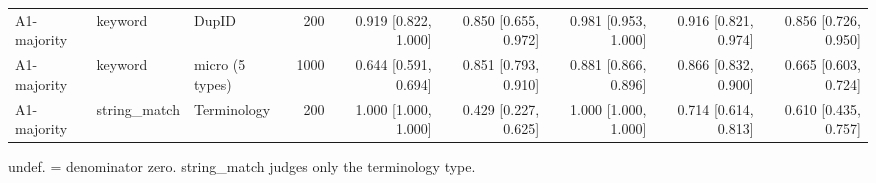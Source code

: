 \begin{table}[t]
\begin{tabular}{lllrrrrrr}
A1-majority & keyword & DupID & 200 & 0.919 [0.822, 1.000] & 0.850 [0.655, 0.972] & 0.981 [0.953, 1.000] & 0.916 [0.821, 0.974] & 0.856 [0.726, 0.950] \\
A1-majority & keyword & micro (5 types) & 1000 & 0.644 [0.591, 0.694] & 0.851 [0.793, 0.910] & 0.881 [0.866, 0.896] & 0.866 [0.832, 0.900] & 0.665 [0.603, 0.724] \\
A1-majority & string\_match & Terminology & 200 & 1.000 [1.000, 1.000] & 0.429 [0.227, 0.625] & 1.000 [1.000, 1.000] & 0.714 [0.614, 0.813] & 0.610 [0.435, 0.757] \\
\bottomrule
\end{tabular}
\par\footnotesize undef. = denominator zero. string\_match judges only the terminology type.
\end{table}
